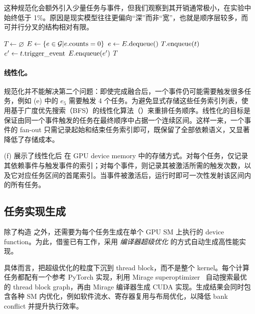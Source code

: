 这种规范化会额外引入少量任务与事件，但我们观察到其开销通常极小，在实验中始终低于 1\%。原因是现实模型往往更偏向“深”而非“宽”，也就是顺序层较多，而可并行分叉的结构相对有限。

\begin{algorithm}
\caption{\sys 的 \graph 线性化算法。该算法保证每个任务只会入队到 $T$ 一次，每个事件只会入队到 $E$ 一次。第 \ref{line:start}--\ref{line:end} 行保证同一事件触发的任务在 $T$ 中连续出现。}
\label{algo:linearization}
\footnotesize
\begin{algorithmic}[1]
\State $T \gets \varnothing$
\State $E \gets \{e \in \mathcal{G}| e.{\rm counts}=0\}$ 
\State $e \gets E.{\rm dequeue()}$
\label{line:start}
\State $T.{\rm enqueue}(t)$\label{line:end}
\State $e' \gets t.{\rm trigger\_event}$
\State $E.{\rm enqueue}(e')$
\EndIf
\EndIf
\EndFor
\EndWhile
\State
\State \Return $T$
\end{algorithmic}
\end{algorithm}

\paragraph{\graph 线性化。}
\graph 规范化并不能解决第二个问题：即使完成融合后，一个事件仍可能需要触发很多任务，例如 (e) 中的 $e_5$ 需要触发 4 个任务。为避免显式存储这些任务索引列表，\sys 使用基于广度优先搜索（BFS）的线性化算法（）来重排任务顺序。线性化的目标是保证由同一个事件触发的任务在最终顺序中占据一个连续区间。这样一来，一个事件的 fan-out 只需记录起始和结束任务索引即可，既保留了全部依赖语义，又显著降低了存储成本。

(f) 展示了线性化后 \graph 在 GPU device memory 中的存储方式。对每个任务，\sys 仅记录其依赖事件与触发事件的索引；对每个事件，则记录其被激活所需的触发次数，以及它对应任务区间的首尾索引。当事件被激活后，运行时即可一次性发射该区间内的所有任务。

\subsection{任务实现生成}
除了构造 \graph 之外，\sys 还需要为每个任务生成在单个 GPU SM 上执行的 device function。为此，\sys 借鉴已有工作，采用 {\em 编译器超级优化} 的方式自动生成高性能实现。

具体而言，\sys 把超级优化的粒度下沉到 thread block，而不是整个 kernel。每个计算任务都配有一个参考 PyTorch 实现，\sys 利用 Mirage superoptimizer~\cite{wu2025mirage} 自动搜索最优的 thread block graph，再由 Mirage 编译器生成 CUDA 实现。生成结果会同时包含各种 SM 内优化，例如软件流水、寄存器复用与布局优化，以降低 bank conflict 并提升执行效率。
